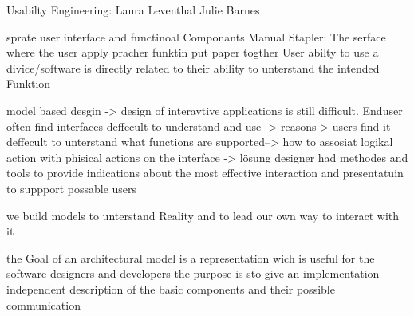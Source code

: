 Usabilty Engineering: Laura Leventhal Julie Barnes

sprate user interface and functinoal Componants
Manual Stapler: The serface where the user apply pracher
funktin put paper togther
User abilty to use a divice/software is directly related to their ability to unterstand the intended  Funktion


model based desgin ->
design of interavtive applications is still difficult.
Enduser often find interfaces deffecult to understand and use -> reasons-> users find it deffecult to unterstand what 
functions are supported--> how to assosiat logikal action with phisical actions on the interface -> lösung designer had methodes and tools to provide indications about the most effective interaction and presentatuin to suppport possable users

we build models to unterstand Reality and to lead our own way to interact with it

the Goal of an architectural model is a representation wich is useful for the software designers and developers the purpose is sto give an implementation-independent description of the basic components and their possible communication